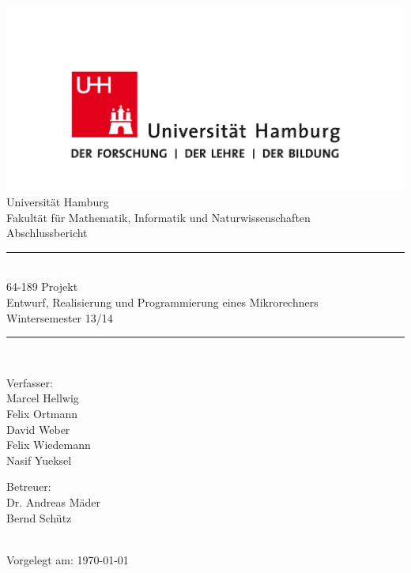 


\begin{fullsizetitle}
\centering
\begin{minipage}{0.75\textwidth}
\vspace*{5em}
\begin{center}
\includegraphics[width=\textwidth]{images/uhh.png}\\
\vspace*{4em}
{\LARGE Universität Hamburg}\\[.25em]
{\Large Fakultät für Mathematik, Informatik und Naturwissenschaften}\\[3em]
{\Huge Abschlussbericht}\\[3em]

\newcommand{\HRule}{\rule{\linewidth}{0.5mm}}
\HRule\\[.4em]
{\Large%
64-189 Projekt\\%
Entwurf, Realisierung und Programmierung eines Mikrorechners\\%
Wintersemester 13/14\\%
}
\HRule\\[3em]

\begin{minipage}[t]{0.4\textwidth}
\begin{flushleft} \large
Verfasser:\\[1em]%
Marcel Hellwig\\%
Felix Ortmann\\%
David Weber\\%
Felix Wiedemann\\%
Nasif Yueksel%
\end{flushleft}
\end{minipage}
\hfill
\begin{minipage}[t]{0.4\textwidth}
\begin{flushright} \large
Betreuer:\\[1em]
Dr. Andreas Mäder\\%
Bernd Schütz%
\end{flushright}
\end{minipage} \\[12em]

{\large Vorgelegt am: \today}
\end{center}
\end{minipage}
\end{fullsizetitle}

